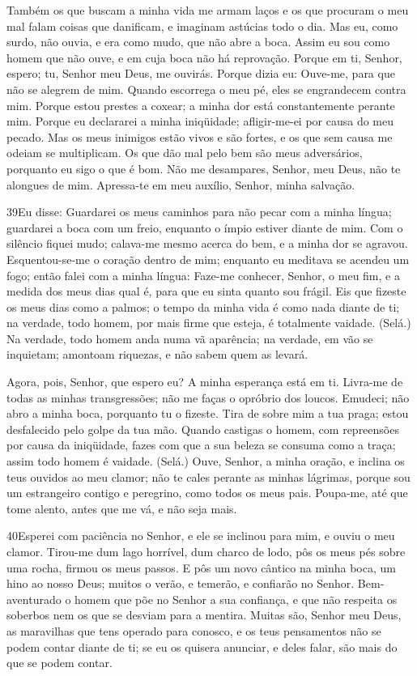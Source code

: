 Também os que buscam a minha vida me armam laços e os que
procuram o meu mal falam coisas que danificam, e imaginam astúcias
todo o dia. Mas eu, como surdo, não ouvia, e era como mudo,
que não abre a boca. Assim eu sou como homem que não ouve, e
em cuja boca não há reprovação. Porque em ti, Senhor, espero;
tu, Senhor meu Deus, me ouvirás. Porque dizia eu: Ouve-me,
para que não se alegrem de mim. Quando escorrega o meu pé, eles se
engrandecem contra mim. Porque estou prestes a coxear; a
minha dor está constantemente perante mim. Porque eu
declararei a minha iniqüidade; afligir-me-ei por causa do meu
pecado. Mas os meus inimigos estão vivos e são fortes, e os
que sem causa me odeiam se multiplicam. Os que dão mal pelo
bem são meus adversários, porquanto eu sigo o que é bom. Não
me desampares, Senhor, meu Deus, não te alongues de mim.
Apressa-te em meu auxílio, Senhor, minha salvação.

\bigskip

\lettrine{39}{}Eu disse: Guardarei os meus caminhos para não
pecar com a minha língua; guardarei a boca com um freio, enquanto o
ímpio estiver diante de mim. Com o silêncio fiquei mudo;
calava-me mesmo acerca do bem, e a minha dor se agravou.
Esquentou-se-me o coração dentro de mim; enquanto eu meditava se
acendeu um fogo; então falei com a minha língua: Faze-me
conhecer, Senhor, o meu fim, e a medida dos meus dias qual é, para
que eu sinta quanto sou frágil. Eis que fizeste os meus dias
como a palmos; o tempo da minha vida é como nada diante de ti; na
verdade, todo homem, por mais firme que esteja, é totalmente
vaidade. (Selá.) Na verdade, todo homem anda numa vã aparência;
na verdade, em vão se inquietam; amontoam riquezas, e não sabem quem
as levará.

Agora, pois, Senhor, que espero eu? A minha esperança está em ti.
Livra-me de todas as minhas transgressões; não me faças o
opróbrio dos loucos. Emudeci; não abro a minha boca, porquanto
tu o fizeste. Tira de sobre mim a tua praga; estou
desfalecido pelo golpe da tua mão. Quando castigas o homem,
com repreensões por causa da iniqüidade, fazes com que a sua beleza
se consuma como a traça; assim todo homem é vaidade. (Selá.)
Ouve, Senhor, a minha oração, e inclina os teus ouvidos ao
meu clamor; não te cales perante as minhas lágrimas, porque sou um
estrangeiro contigo e peregrino, como todos os meus pais.
Poupa-me, até que tome alento, antes que me vá, e não seja
mais.

\bigskip

\lettrine{40}{}Esperei com paciência no Senhor, e ele se
inclinou para mim, e ouviu o meu clamor. Tirou-me dum lago
horrível, dum charco de lodo, pôs os meus pés sobre uma rocha,
firmou os meus passos. E pôs um novo cântico na minha boca, um
hino ao nosso Deus; muitos o verão, e temerão, e confiarão no
Senhor. Bem-aventurado o homem que põe no Senhor a sua
confiança, e que não respeita os soberbos nem os que se desviam para
a mentira. Muitas são, Senhor meu Deus, as maravilhas que tens
operado para conosco, e os teus pensamentos não se podem contar
diante de ti; se eu os quisera anunciar, e deles falar, são mais do
que se podem contar.

